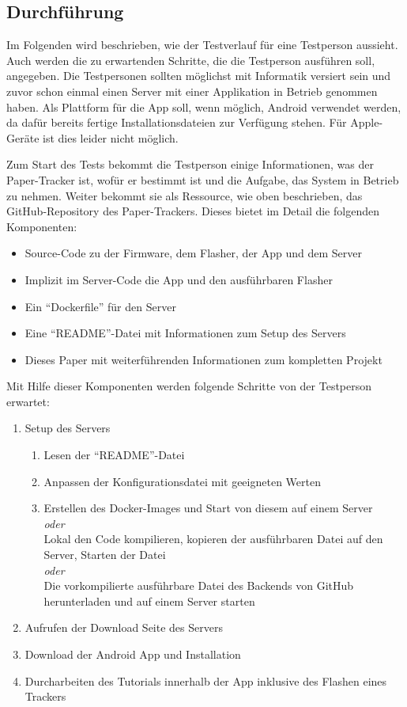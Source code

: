 \subsection{Durchführung}
Im Folgenden wird beschrieben, wie der Testverlauf für eine Testperson aussieht.
Auch werden die zu erwartenden Schritte, die die Testperson ausführen soll, angegeben.
Die Testpersonen sollten möglichst mit Informatik versiert sein und zuvor schon einmal einen Server mit einer
Applikation in Betrieb genommen haben.
Als Plattform für die App soll, wenn möglich, Android verwendet werden, da dafür bereits fertige Installationsdateien
zur Verfügung stehen.
Für Apple-Geräte ist dies leider nicht möglich.

Zum Start des Tests bekommt die Testperson einige Informationen, was der Paper-Tracker ist, wofür er bestimmt ist
und die Aufgabe, das System in Betrieb zu nehmen.
Weiter bekommt sie als Ressource, wie oben beschrieben, das GitHub-Repository des Paper-Trackers.
Dieses bietet im Detail die folgenden Komponenten:
\begin{itemize}
	\item Source-Code zu der Firmware, dem Flasher, der App und dem Server
	\item Implizit im Server-Code die App und den ausführbaren Flasher
	\item Ein \enquote{Dockerfile} für den Server
	\item Eine \enquote{README}-Datei mit Informationen zum Setup des Servers
	\item Dieses Paper mit weiterführenden Informationen zum kompletten Projekt
\end{itemize}

Mit Hilfe dieser Komponenten werden folgende Schritte von der Testperson erwartet:
\begin{enumerate}
	\item Setup des Servers
	\begin{enumerate}
		\item Lesen der \enquote{README}-Datei
		\item Anpassen der Konfigurationsdatei mit geeigneten Werten
		\item Erstellen des Docker-Images und Start von diesem auf einem Server \hfill \\
			\hspace*{10mm} \emph{oder} \hfill \\
			Lokal den Code kompilieren, kopieren der ausführbaren Datei auf den Server, Starten der Datei
			\\
			\hspace*{10mm} \emph{oder} \\
			Die vorkompilierte ausführbare Datei des Backends von GitHub herunterladen und auf einem
			Server starten
	\end{enumerate}
	\item Aufrufen der Download Seite des Servers
	\item Download der Android App und Installation
	\item Durcharbeiten des Tutorials innerhalb der App inklusive des Flashen eines Trackers
\end{enumerate}

